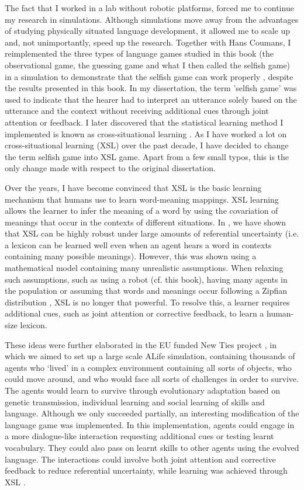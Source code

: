The fact that I worked in a lab without robotic platforms, forced me to continue my research in simulations. Although simulations move away from the advantages of studying physically situated language development, it allowed me to scale up and, not unimportantly, speed up the research. 
Together with Hans Coumans, I reimplemented the three types of language games studied in this book (the observational game, the guessing game and what I then called the selfish game) in a simulation to demonstrate that the selfish game can work properly \citep{vogtcoumans:2003}, despite the results presented in this book. In my dissertation, the term 'selfish game' was used to indicate that the hearer had to interpret an utterance solely based on the utterance and the context without receiving additional cues through joint attention or feedback. I later discovered that the statistical learning method I implemented is known as {\sc cross-situational learning} \citep{pinker:1989,siskind:1996}. As I have worked a lot on cross-situational learning (XSL) over the past decade, I have decided to change the term selfish game into {\sc XSL game}. Apart from a few small typos, this is the only change made with respect to the original dissertation.

Over the years, I have become convinced that XSL is the basic learning mechanism that humans use to learn word-meaning mappings. XSL learning allows the learner to infer the meaning of a word by using the covariation of meanings that occur in the contexts of different situations. In \citet{smithetal:2006}, we have shown that XSL can be highly robust under large amounts of referential uncertainty (i.e. a lexicon can be learned well even when an agent hears a word in contexts containing many possible meanings). However, this was shown using a mathematical model containing many unrealistic assumptions. When relaxing such assumptions, such as using a robot (cf. this book), having many agents in the population \citep{vogtcoumans:2003} or assuming that words and meanings occur following a Zipfian distribution \citep{vogt:2012}, XSL is no longer that powerful. To resolve this, a learner requires additional cues, such as joint attention or corrective feedback, to learn a human-size lexicon. 

These ideas were further elaborated in the EU funded New Ties project \citep{gilbertetal:2006}, in which we aimed to set up a large scale ALife simulation, containing thousands of agents who ‘lived' in a complex environment containing all sorts of objects, who could move around, and who would face all sorts of challenges in order to survive. The agents would learn to survive through evolutionary adaptation based on genetic transmission, individual learning and social learning of skills and language. Although we only succeeded partially, an interesting modification of the language game was implemented. In this implementation, agents could engage in a more dialogue-like interaction requesting additional cues or testing learnt vocabulary. They could also pass on learnt skills to other agents using the evolved language. The interactions could involve both joint attention and corrective feedback to reduce referential uncertainty, while learning was achieved through XSL \citep{vogtdivina:2007,vogthaasdijk:2010}.

